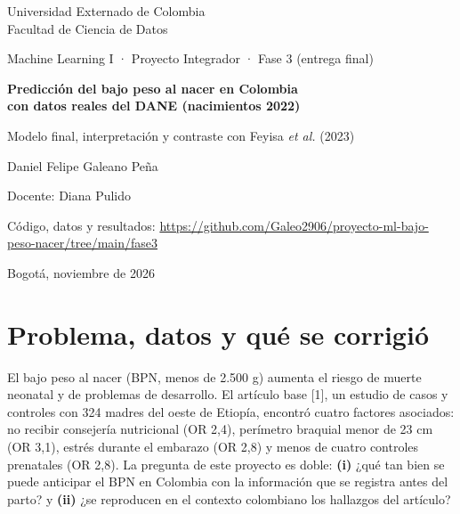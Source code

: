 \documentclass[11pt,a4paper]{article}
\newcommand{\cita}[1]{[#1]}
\begin{document}
\begin{titlepage}
\centering
\vspace*{2cm}
{\large Universidad Externado de Colombia\\Facultad de Ciencia de Datos\par}
\vspace{0.6cm}
{\large Machine Learning I · Proyecto Integrador · Fase 3 (entrega final)\par}
\vspace{2.5cm}
{\LARGE\bfseries Predicción del bajo peso al nacer en Colombia\\[0.3em] con datos reales del DANE (nacimientos 2022)\par}
\vspace{0.8cm}
{\large Modelo final, interpretación y contraste con Feyisa \emph{et al.} (2023)\par}
\vspace{2.5cm}
{\large Daniel Felipe Galeano Peña\par}
\vspace{0.3cm}
{Docente: Diana Pulido\par}
\vfill
{Código, datos y resultados: \url{https://github.com/Galeo2906/proyecto-ml-bajo-peso-nacer/tree/main/fase3}\par}
\vspace{0.3cm}
{Bogotá, noviembre de 2026\par}
\end{titlepage}

\section{Problema, datos y qué se corrigió}

El bajo peso al nacer (BPN, menos de 2.500 g) aumenta el riesgo de muerte neonatal y de problemas de desarrollo. El artículo base \cita{1}, un estudio de casos y controles con 324 madres del oeste de Etiopía, encontró cuatro factores asociados: no recibir consejería nutricional (OR 2,4), perímetro braquial menor de 23 cm (OR 3,1), estrés durante el embarazo (OR 2,8) y menos de cuatro controles prenatales (OR 2,8). La pregunta de este proyecto es doble: \textbf{(i)} ¿qué tan bien se puede anticipar el BPN en Colombia con la información que se registra antes del parto? y \textbf{(ii)} ¿se reproducen en el contexto colombiano los hallazgos del artículo?
\end{document}
